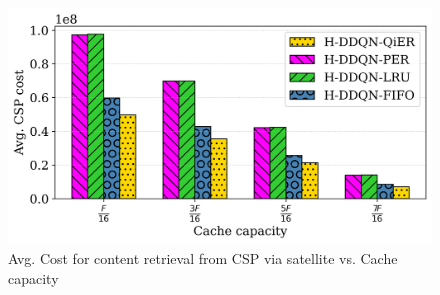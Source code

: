 \documentclass[journal]{IEEEtran}
\begin{document}
\begin{figure}[htbp]
    \centering
    \includegraphics[width=\linewidth]{MinMax Cost Scaled/avg_cost_vs_cache_capacity_bar.png}  %
    \caption{Avg. Cost for content retrieval from CSP via satellite vs. Cache capacity}
    \label{fig:avg_cost_vs_cache_capacity}
\end{figure}


\end{document}
